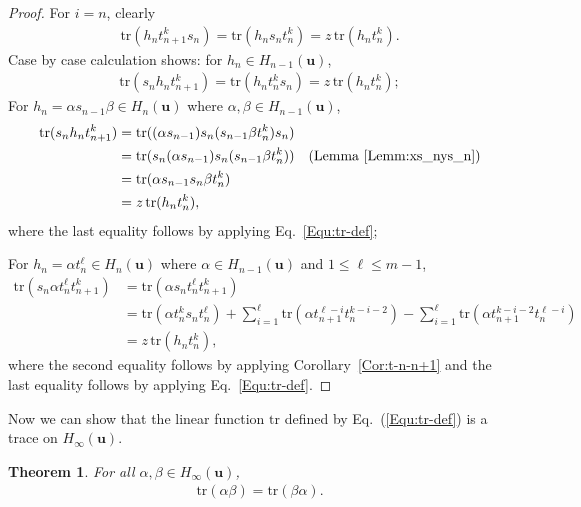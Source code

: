 \documentclass[a4paper, oneside]{amsart}
\numberwithin{equation}{section}
\newtheorem{theorem}[equation]{Theorem}
\theoremstyle{definition}
\theoremstyle{remark}
\begin{document}
\begin{proof}
For $i=n$, clearly
\begin{align*}
 \mathrm{tr}(h_{n}t_{n+1}^ks_n)=\mathrm{tr}(h_{n}s_{n}t_n^{k})=z\,\mathrm{tr}(h_{n}t_n^{k}).
\end{align*}
 Case by case calculation shows: for  $h_{n}\in H_{n-1}(\boldsymbol{u})$,
 \begin{align*}
  \mathrm{tr}(s_nh_{n}t_{n+1}^k)=\mathrm{tr}(h_{n}t_{n}^ks_n)=z\,\mathrm{tr}(h_{n}t_{n}^k);
 \end{align*}
For $h_{n}=\alpha s_{n-1}\beta\in H_{n}(\boldsymbol{u})$ where $\alpha,\beta\in H_{n-1}(\boldsymbol{u})$,
\begin{align*}
\mathrm{tr}(s_nh_{n}t_{n+1}^k)&=
\mathrm{tr}((\alpha  s_{n-1})s_n(s_{n-1}\beta t_{n}^k)s_n)\\
&=\mathrm{tr}(s_n(\alpha  s_{n-1})s_n(s_{n-1}\beta t_{n}^k)) \quad \text{(Lemma~\ref{Lemm:xs_nys_n})}\\
&=\mathrm{tr}(\alpha s_{n-1}s_n\beta t_{n}^k)\\
&=z\,\mathrm{tr}(h_{n}t_{n}^k),
\end{align*}
where the last equality follows by applying Eq.~\eqref{Equ:tr-def};

 For $h_{n}=\alpha t_{n}^{\ell}\in H_{n}(\boldsymbol{u})$ where $\alpha\in H_{n-1}(\boldsymbol{u})$ and $1\leq \ell\leq m-1$,
\begin{align*}
\mathrm{tr}(s_n\alpha t_n^{\ell} t_{n+1}^k)
&=\mathrm{tr}(\alpha s_n t_n^{\ell}t_{n+1}^k)\\
&=\mathrm{tr}(\alpha t_n^{k}s_nt_n^{\ell})+\sum_{i=1}^{\ell}\mathrm{tr}(\alpha t_{n+1}^{\ell-i}t_{n}^{k-i-2})-\sum_{i=1}^{\ell}\mathrm{tr}(\alpha t_{n+1}^{k-i-2}t_{n}^{\ell-i})\\
&=z\,\mathrm{tr}(h_{n}t_{n}^k),
\end{align*}
where the second equality follows by applying Corollary~\ref{Cor:t-n-n+1} and the last equality follows by applying Eq.~\eqref{Equ:tr-def}.  \end{proof}


Now we can show that the linear function $\mathrm{tr}$ defined by Eq.~(\ref{Equ:tr-def}) is a trace on $H_{\infty}(\boldsymbol{u})$.

\begin{theorem}\label{Them:alpha-beta=beta-alpha}For all $\alpha,\beta\in H_{\infty}(\boldsymbol{u})$,
\begin{align*}\mathrm{tr}(\alpha\beta)=\mathrm{tr}(\beta\alpha).
\end{align*}
\end{theorem}
\end{document}
